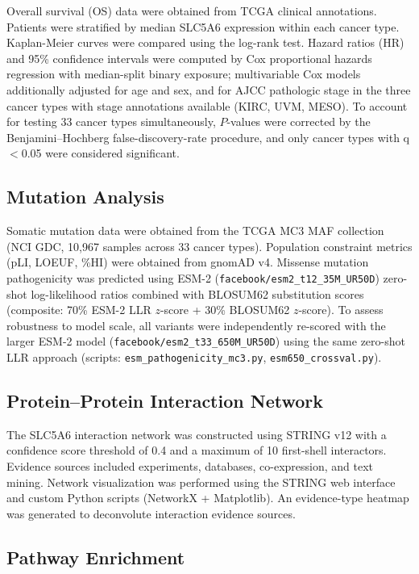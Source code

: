 \documentclass[10pt,letterpaper]{article}
\begin{document}
Overall survival (OS) data were obtained from TCGA clinical annotations. Patients were stratified by median SLC5A6 expression within each cancer type. Kaplan-Meier curves were compared using the log-rank test. Hazard ratios (HR) and 95\% confidence intervals were computed by Cox proportional hazards regression with median-split binary exposure; multivariable Cox models additionally adjusted for age and sex, and for AJCC pathologic stage in the three cancer types with stage annotations available (KIRC, UVM, MESO). To account for testing 33 cancer types simultaneously, $P$-values were corrected by the Benjamini--Hochberg false-discovery-rate procedure, and only cancer types with q$<$0.05 were considered significant.

\subsection*{Mutation Analysis}

Somatic mutation data were obtained from the TCGA MC3 MAF collection (NCI GDC, 10,967 samples across 33 cancer types). Population constraint metrics (pLI, LOEUF, \%HI) were obtained from gnomAD v4. Missense mutation pathogenicity was predicted using ESM-2 (\nolinkurl{facebook/esm2_t12_35M_UR50D}) zero-shot log-likelihood ratios combined with BLOSUM62 substitution scores (composite: 70\% ESM-2 LLR $z$-score + 30\% BLOSUM62 $z$-score). To assess robustness to model scale, all variants were independently re-scored with the larger ESM-2 model (\nolinkurl{facebook/esm2_t33_650M_UR50D}) using the same zero-shot LLR approach (scripts: \texttt{esm\_pathogenicity\_mc3.py}, \texttt{esm650\_crossval.py}).

\subsection*{Protein--Protein Interaction Network}

The SLC5A6 interaction network was constructed using STRING v12 with a confidence score threshold of 0.4 and a maximum of 10 first-shell interactors. Evidence sources included experiments, databases, co-expression, and text mining. Network visualization was performed using the STRING web interface and custom Python scripts (NetworkX + Matplotlib). An evidence-type heatmap was generated to deconvolute interaction evidence sources.

\subsection*{Pathway Enrichment}
\end{document}
